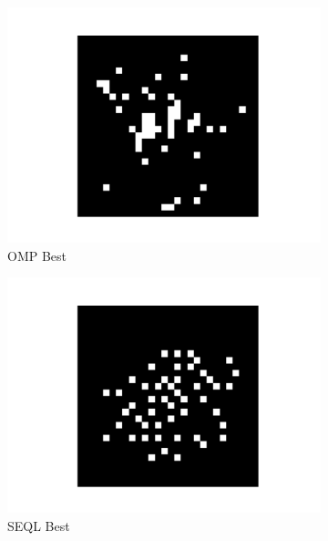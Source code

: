\documentclass[a4paper,twocolumn]{article} %
\begin{document}
\begin{figure}[h!]
\begin{subfigure}[t]{0.19\linewidth}
        \includegraphics[width=\linewidth]{figures/best_seed_omp.pdf}
        \caption*{OMP Best}
    \end{subfigure}
    \hfill
    \begin{subfigure}[t]{0.19\linewidth}
        \includegraphics[width=\linewidth]{figures/best_seed_seql.pdf}
        \caption*{SEQL Best}
    \end{subfigure}
    \hfill
    \begin{subfigure}[t]{0.19\linewidth}

\end{subfigure}
\end{figure}
\end{document}
